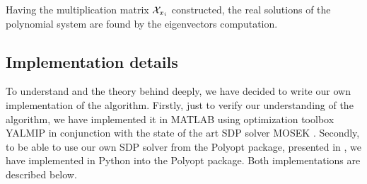 Having the multiplication matrix $\mathcal{X}_{x_i}$ constructed, the real solutions of the polynomial system  are found by the eigenvectors computation.

\subsection{Implementation details}
To understand  and the theory behind deeply, we have decided to write our own implementation of the algorithm.
Firstly, just to verify our understanding of the algorithm, we have implemented it in MATLAB using optimization toolbox YALMIP \cite{yalmip} in conjunction with the state of the art SDP solver MOSEK \cite{mosek}.
Secondly, to be able to use our own SDP solver from the Polyopt package, presented in , we have implemented  in Python into the Polyopt package.
Both implementations are described below.


